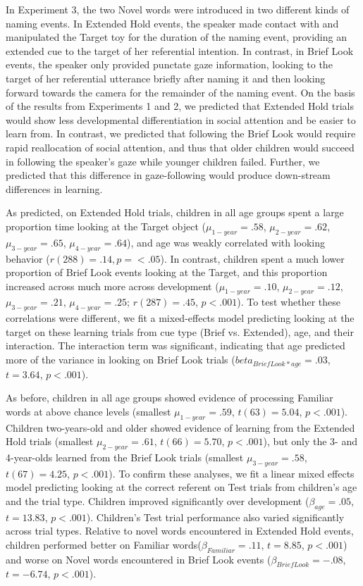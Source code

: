 \documentclass[jou,floatsintext]{apa6}
\begin{document}
In Experiment 3, the two Novel words were introduced in two different kinds of naming events. In Extended Hold events, the speaker made contact with and manipulated the Target toy for the duration of the naming event, providing an extended cue to the target of her referential intention. In contrast, in Brief Look events, the speaker only provided punctate gaze information, looking to the target of her referential utterance briefly after naming it and then looking forward towards the camera for the remainder of the naming event. On the basis of the results from Experiments 1 and 2, we predicted that Extended Hold trials would show less developmental differentiation in social attention and be easier to learn from. In contrast, we predicted that following the Brief Look would require rapid reallocation of social attention, and thus that older children would succeed in following the speaker's gaze while younger children failed. Further, we predicted that this difference in gaze-following would produce down-stream differences in learning.

As predicted, on Extended Hold trials, children in all age groups spent a large proportion time looking at the Target object ($\mu_{1-year} = .58$, $\mu_{2-year} = .62$, $\mu_{3-year} = .65$, $\mu_{4-year} = .64$), and age was weakly correlated with looking behavior ($r(288) = .14, p = <.05$). In contrast, children spent a much lower proportion of Brief Look events looking at the Target, and this proportion increased across much more across development ($\mu_{1-year} = .10$, $\mu_{2-year} = .12$, $\mu_{3-year} = .21$, $\mu_{4-year} = .25$; $r(287) = .45$, $p < .001$). To test whether these correlations were different, we fit a mixed-effects model predicting looking at the target on these learning trials from cue type (Brief vs. Extended), age, and their interaction. The interaction term was significant, indicating that age predicted more of the variance in looking on Brief Look trials ($beta_{Brief Look * age} = .03$, $t = 3.64$, $p < . 001$).

As before, children in all age groups showed evidence of processing Familiar words at above chance levels (smallest $\mu_{1-year} = .59$, $t(63) = 5.04$, $p < .001$). Children two-years-old and older showed evidence of learning from the Extended Hold trials (smallest $\mu_{2-year} = .61$, $t(66) = 5.70$, $p < .001$), but only the 3- and 4-year-olds learned from the Brief Look trials (smallest $\mu_{3-year} = .58$, $t(67) = 4.25$, $p < .001$). To confirm these analyses, we fit a linear mixed effects model predicting looking at the correct referent on Test trials from children's age and the trial type. Children improved significantly over development ($\beta_{age} = .05$, $t = 13.83$, $p < .001$). Children's Test trial performance also varied significantly across trial types. Relative to novel words encountered in Extended Hold events, children performed better on Familiar words($\beta_{Familiar} = .11$, $t = 8.85$, $p < .001$) and worse on Novel words encountered in Brief Look events ($\beta_{Brief Look} = -.08$, $t = -6.74$, $p < .001$).
\end{document}

